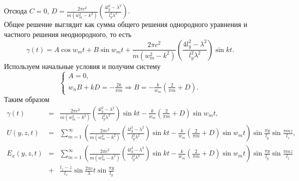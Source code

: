 Отсюда $C = 0$, $D = \frac{2\pi c^2}{m(w_m^2 - k^2)}\left(\frac{4l_y^2 - \lambda^2}{l_y^2\lambda^2} \right)$.\\
Общее решение выглядит как сумма общего решения однородного уравнения и частного решения неоднородного, то есть
\[
\gamma(t) = A\cos{w_mt} + B\sin{w_mt} + \frac{2\pi c^2}{m(w_m^2 - k^2)}\left(\frac{4l_y^2 - \lambda^2}{l_y^2\lambda^2} \right)\sin{kt}.
\]
Используем начальные условия и получим систему
\[
\left\{
  \begin{array}{l}
    A = 0,\\
    w_nB + kD = -\frac{2k}{\pi m} \Rightarrow B = -\frac{k}{w_m}\left(\frac{2}{\pi m} + D \right).
  \end{array}
\right.
\]
Таким образом
\begin{eqnarray*}
  \gamma(t) &=& \frac{2\pi c^2}{m(w_m^2 - k^2)}\left(\frac{4l_y^2 - \lambda^2}{l_y^2\lambda^2} \right)\sin{kt} - \frac{k}{w_m}\left(\frac{2}{\pi m} + D\right)\sin{w_mt},\\
  U(y, z, t) &=& \displaystyle \sum_{m=1}^{\infty} \left( \frac{2\pi c^2}{m(w_m^2 - k^2)}\left(\frac{4l_y^2 - \lambda^2}{l_y^2\lambda^2} \right)\sin{kt} - \frac{k}{w_m}\left(\frac{2}{\pi m} + D\right)\sin{w_mt} \right) \sin\frac{\pi y}{l_y} \sin\frac{\pi m z}{l_z},\\
  E_x(y, z, t) &=& \displaystyle
    \sum_{m=1}^{\infty} \left( \frac{2\pi c^2}{m(w_m^2 - k^2)}\left(\frac{4l_y^2 - \lambda^2}{l_y^2\lambda^2} \right)\sin{kt} - \frac{k}{w_m}\left(\frac{2}{\pi m} + D\right)\sin{w_mt} \right) \sin\frac{\pi y}{l_y} \sin\frac{\pi m z}{l_z}\\
    &+& \frac{l_z - z}{l_z} \sin\frac{2\pi c}{\lambda}t \sin\frac{\pi y}{l_y}
\end{eqnarray*}
